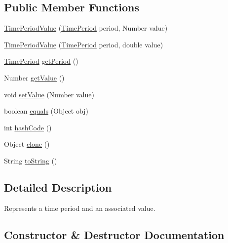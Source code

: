 \subsection*{Public Member Functions}
\begin{DoxyCompactItemize}
\item 
\mbox{\hyperlink{classorg_1_1jfree_1_1data_1_1time_1_1_time_period_value_aa7e8079c4bd333898c59a9c6d10586fd}{Time\+Period\+Value}} (\mbox{\hyperlink{interfaceorg_1_1jfree_1_1data_1_1time_1_1_time_period}{Time\+Period}} period, Number value)
\item 
\mbox{\hyperlink{classorg_1_1jfree_1_1data_1_1time_1_1_time_period_value_ada504ce84556ff0c9910079795e94f76}{Time\+Period\+Value}} (\mbox{\hyperlink{interfaceorg_1_1jfree_1_1data_1_1time_1_1_time_period}{Time\+Period}} period, double value)
\item 
\mbox{\hyperlink{interfaceorg_1_1jfree_1_1data_1_1time_1_1_time_period}{Time\+Period}} \mbox{\hyperlink{classorg_1_1jfree_1_1data_1_1time_1_1_time_period_value_ac9fdaf9f3edcf0a997615d7f8c2bdd5f}{get\+Period}} ()
\item 
Number \mbox{\hyperlink{classorg_1_1jfree_1_1data_1_1time_1_1_time_period_value_a8477b0ff36ad1cc849c4c9e551c2037d}{get\+Value}} ()
\item 
void \mbox{\hyperlink{classorg_1_1jfree_1_1data_1_1time_1_1_time_period_value_a9ad181683e60a30e7aca9ae087710301}{set\+Value}} (Number value)
\item 
boolean \mbox{\hyperlink{classorg_1_1jfree_1_1data_1_1time_1_1_time_period_value_afbd023fb8ba6b764ba2d866adab5977f}{equals}} (Object obj)
\item 
int \mbox{\hyperlink{classorg_1_1jfree_1_1data_1_1time_1_1_time_period_value_ae1a068483a9951b4a048e82bf4ad4e81}{hash\+Code}} ()
\item 
Object \mbox{\hyperlink{classorg_1_1jfree_1_1data_1_1time_1_1_time_period_value_aebd9057a9710b15ab679996333dc0b32}{clone}} ()
\item 
String \mbox{\hyperlink{classorg_1_1jfree_1_1data_1_1time_1_1_time_period_value_ab5c2a219be15dd426f8b689a78f2e882}{to\+String}} ()
\end{DoxyCompactItemize}


\subsection{Detailed Description}
Represents a time period and an associated value. 

\subsection{Constructor \& Destructor Documentation}
\mbox{\label{classorg_1_1jfree_1_1data_1_1time_1_1_time_period_value_aa7e8079c4bd333898c59a9c6d10586fd}} 
